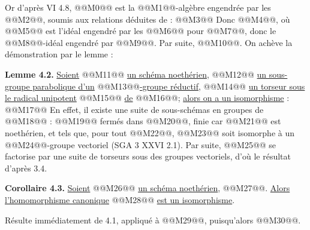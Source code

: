 
Or d'après VI 4.8, @@M0@@ est la @@M1@@-algèbre
engendrée par les @@M2@@, soumis aux relations déduites de :
@@M3@@
Donc @@M4@@, où @@M5@@ est l'idéal engendré par les @@M6@@ pour @@M7@@, donc le @@M8@@-idéal engendré par @@M9@@. Par suite,
@@M10@@. On achève la démonstration par le lemme :

\textbf{Lemme 4.2.} \uline{Soient} @@M11@@ \uline{un schéma noethérien}, @@M12@@ \uline{un sous-groupe parabolique d'un} @@M13@@\uline{-groupe réductif}, @@M14@@ \uline{un torseur sous le radical unipotent} @@M15@@ \uline{de} @@M16@@; \uline{alors on a un isomorphisme} :
@@M17@@
En effet, il existe une suite de sous-schémas en groupes de @@M18@@ :
@@M19@@
fermés dans @@M20@@, finie car @@M21@@ est noethérien, et tels que, pour tout @@M22@@, @@M23@@ soit isomorphe à un @@M24@@-groupe vectoriel (SGA 3 XXVI 2.1). Par suite, @@M25@@ se factorise par une suite de torseurs sous des groupes vectoriels, d'où le résultat d'après 3.4.

\textbf{Corollaire 4.3.} \uline{Soient} @@M26@@ \uline{un schéma noethérien}, @@M27@@. \uline{Alors l'homomorphisme canonique} @@M28@@ \uline{est un isomorphisme}.

Résulte immédiatement de 4.1, appliqué à @@M29@@, puisqu'alors @@M30@@.

